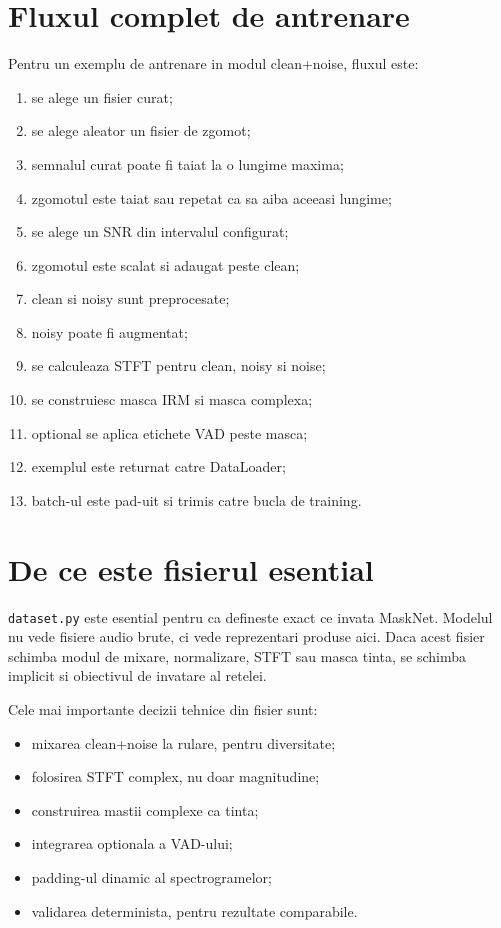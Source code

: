 \documentclass[12pt,a4paper]{report}
\begin{document}
\chapter{Fluxul complet de antrenare}

Pentru un exemplu de antrenare in modul clean+noise, fluxul este:

\begin{enumerate}
    \item se alege un fisier curat;
    \item se alege aleator un fisier de zgomot;
    \item semnalul curat poate fi taiat la o lungime maxima;
    \item zgomotul este taiat sau repetat ca sa aiba aceeasi lungime;
    \item se alege un SNR din intervalul configurat;
    \item zgomotul este scalat si adaugat peste clean;
    \item clean si noisy sunt preprocesate;
    \item noisy poate fi augmentat;
    \item se calculeaza STFT pentru clean, noisy si noise;
    \item se construiesc masca IRM si masca complexa;
    \item optional se aplica etichete VAD peste masca;
    \item exemplul este returnat catre DataLoader;
    \item batch-ul este pad-uit si trimis catre bucla de training.
\end{enumerate}

\chapter{De ce este fisierul esential}

\texttt{dataset.py} este esential pentru ca defineste exact ce invata MaskNet. Modelul nu vede fisiere audio brute, ci vede reprezentari produse aici. Daca acest fisier schimba modul de mixare, normalizare, STFT sau masca tinta, se schimba implicit si obiectivul de invatare al retelei.

Cele mai importante decizii tehnice din fisier sunt:

\begin{itemize}
    \item mixarea clean+noise la rulare, pentru diversitate;
    \item folosirea STFT complex, nu doar magnitudine;
    \item construirea mastii complexe ca tinta;
    \item integrarea optionala a VAD-ului;
    \item padding-ul dinamic al spectrogramelor;
    \item validarea determinista, pentru rezultate comparabile.
\end{itemize}
\end{document}
